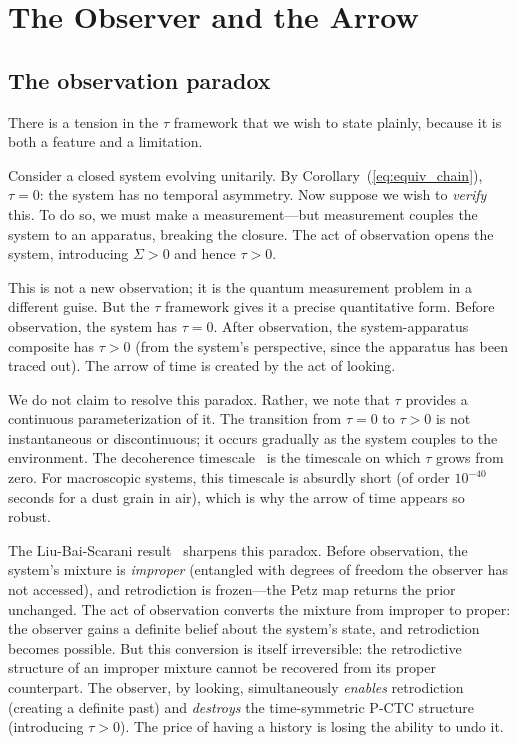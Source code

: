 \documentclass[12pt]{article}
\theoremstyle{definition}
\theoremstyle{remark}
\newcommand{\tauasym}{\tau}
\begin{document}
\section{The Observer and the Arrow}
\label{sec:observer}

\subsection{The observation paradox}

There is a tension in the $\tauasym$ framework that we wish to
state plainly, because it is both a feature and a limitation.

Consider a closed system evolving unitarily.  By
Corollary~(\ref{eq:equiv_chain}), $\tauasym = 0$: the
system has no temporal asymmetry.  Now suppose we wish to
\emph{verify} this.  To do so, we must make a measurement---but
measurement couples the system to an apparatus, breaking the
closure.  The act of observation opens the system, introducing
$\Sigma > 0$ and hence $\tauasym > 0$.

This is not a new observation; it is the quantum measurement
problem in a different guise.  But the $\tauasym$ framework
gives it a precise quantitative form.  Before observation, the
system has $\tauasym = 0$.  After observation, the
system-apparatus composite has $\tauasym > 0$ (from the
system's perspective, since the apparatus has been traced out).
The arrow of time is created by the act of looking.

We do not claim to resolve this paradox.  Rather, we note that
$\tauasym$ provides a continuous parameterization of it.
The transition from $\tauasym = 0$ to $\tauasym > 0$ is not
instantaneous or discontinuous; it occurs gradually as the
system couples to the environment.  The decoherence
timescale~\cite{Zurek2003} is the timescale on which $\tauasym$
grows from zero.  For macroscopic systems, this timescale is
absurdly short (of order $10^{-40}$ seconds for a dust grain in
air), which is why the arrow of time appears so robust.

The Liu-Bai-Scarani result~\cite{Liu2026} sharpens this paradox.
Before observation, the system's mixture is \emph{improper}
(entangled with degrees of freedom the observer has not accessed),
and retrodiction is frozen---the Petz map returns the prior
unchanged.  The act of observation converts the mixture from
improper to proper: the observer gains a definite belief about the
system's state, and retrodiction becomes possible.
But this conversion is itself irreversible: the retrodictive
structure of an improper mixture cannot be recovered from its
proper counterpart.  The observer, by looking, simultaneously
\emph{enables} retrodiction (creating a definite past) and
\emph{destroys} the time-symmetric P-CTC structure
(introducing $\tauasym > 0$).  The price of having a history
is losing the ability to undo it.
\end{document}

